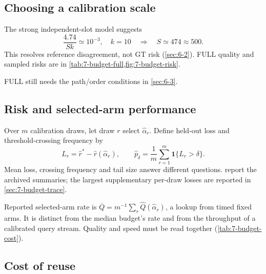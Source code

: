 \subsection{Choosing a calibration scale}

The strong independent-slot model suggests
\[
 \frac{4.74}{Sk}\simeq10^{-3},\quad k=10
 \quad\Longrightarrow\quad S\simeq474\approx500.
\]
This resolves reference disagreement, not GT risk (\cref{sec:6-2}). FULL quality and sampled risks are in \cref{tab:7-budget-full,fig:7-budget-risk}.

FULL still needs the path/order conditions in \cref{sec:6-3}.


\subsection{Risk and selected-arm performance}

Over $m$ calibration draws, let draw $r$ select $\widehat\alpha_r$.
Define held-out loss and threshold-crossing frequency by
\begin{equation}
 L_r=\widehat r^*-\widehat r(\widehat\alpha_r),\qquad
 \widehat p_\delta=\frac{1}{m}\sum_{r=1}^{m}\mathbf1\{L_r>\delta\}.
 \label{eq:6-risk}
\end{equation}
Mean loss, crossing frequency and tail size answer different questions.
 report the archived summaries;
the largest supplementary per-draw losses are reported in \cref{sec:7-budget-trace}.

Reported selected-arm rate is
$\overline Q=m^{-1}\sum_r\widehat Q(\widehat\alpha_r)$, a lookup from timed
fixed arms. It is distinct from the median budget's rate and from the
throughput of a calibrated query stream. Quality and speed must be read
together (\cref{tab:7-budget-cost}).

\subsection{Cost of reuse}

